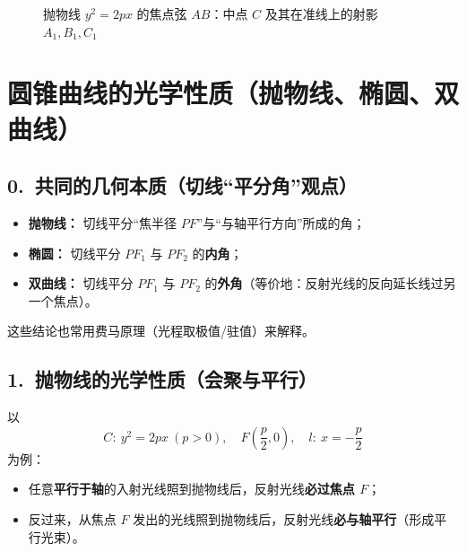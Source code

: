 \documentclass{ctexart}
\begin{document}
\begin{figure}[htbp]
{
	}
		\caption{抛物线 $y^{2}=2px$ 的焦点弦 $AB$：中点 $C$ 及其在准线上的射影 $A_1,B_1,C_1$}
	\end{figure}
	
	\section*{圆锥曲线的光学性质（抛物线、椭圆、双曲线）}
	
	\subsection*{0.\ 共同的几何本质（切线“平分角”观点）}
	
	
	
	
	
	\begin{itemize}
		\item \textbf{抛物线：} 切线平分“焦半径 $PF$”与“与轴平行方向”所成的角；
		\item \textbf{椭圆：} 切线平分 $PF_1$ 与 $PF_2$ 的\textbf{内角}；
		\item \textbf{双曲线：} 切线平分 $PF_1$ 与 $PF_2$ 的\textbf{外角}（等价地：反射光线的反向延长线过另一个焦点）。
	\end{itemize}
	这些结论也常用费马原理（光程取极值/驻值）来解释。
	
	\subsection*{1.\ 抛物线的光学性质（会聚与平行）}
	以
	\[
	C:\ y^2=2px\ (p>0),\quad F\left(\frac p2,0\right),\quad l:\ x=-\frac p2
	\]
	为例：
	\begin{itemize}
		\item 任意\textbf{平行于轴}的入射光线照到抛物线后，反射光线\textbf{必过焦点 $F$}；
		\item 反过来，从焦点 $F$ 发出的光线照到抛物线后，反射光线\textbf{必与轴平行}（形成平行光束）。
	\end{itemize}
	
\end{document}
